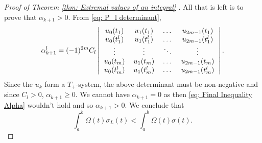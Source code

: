 \begin{proof}[Proof of Theorem \ref{thm: Extremal values of an integral} ]
	 All that is left is to prove that $\alpha_{k+1} > 0$. From \eqref{eq: P_l determinant},
	 \begin{equation}
	 	\alpha_{k+1}^l = (-1)^{2m}C_l\left|
	 	\begin{tabular}{cccc}
	 	$u_0(t_1)$ & $u_1(t_1)$&\dots & $u_{2m-1}(t_1)$\\
	 	$u_0(t_1^l)$ & $u_1(t_1^l)$&\dots & $u_{2m-1}(t_1^l)$\\
	 	\vdots & \vdots & $\ddots$ & \vdots\\
	 	$u_0(t_m)$ & $u_1(t_m)$&\dots & $u_{2m-1}(t_m)$\\
	 	$u_0(t_m^l)$ & $u_1(t_m^l)$&\dots & $u_{2m-1}(t_m^l)$
	 	\end{tabular}\right|.
	 \end{equation}
	 Since the $u_k$ form a $T_+$-system, the above determinant must be non-negative and since $C_l > 0$, $\alpha_{k+1} \geq 0$. We cannot have $\alpha_{k+1} = 0$ as then \eqref{eq: Final Inequality Alpha} wouldn't hold and so $\alpha_{k+1} > 0$. We conclude that
	 \begin{equation}
	 \int_a^b \Omega(t) \sigma_L(t) <  \int_a^b \Omega(t) \sigma(t).
	 \label{eq: Final Inequality}
	 \end{equation}
	 
	
\end{proof}


